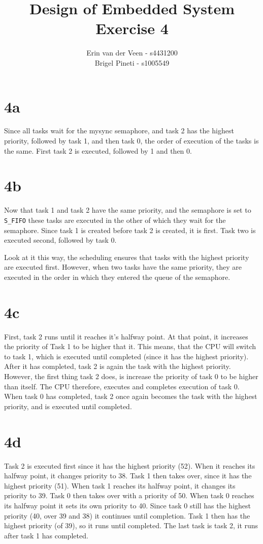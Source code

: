 \documentclass{scrartcl}
\title{Design of Embedded System\\Exercise 4}
\author{Erin van der Veen - s4431200\\
	Brigel Pineti - s1005549}
\begin{document}
\maketitle

\section*{4a}
Since all tasks wait for the mysync semaphore, and task 2 has the highest priority, followed by task 1, and then task 0, the order of execution of the tasks is the same.
First task 2 is executed, followed by 1 and then 0.

\section*{4b}
Now that task 1 and task 2 have the same priority, and the semaphore is set to \lstinline|S_FIFO| these tasks are executed in the other of which they wait for the semaphore.
Since task 1 is created before task 2 is created, it is first.
Task two is executed second, followed by task 0.

Look at it this way, the scheduling ensures that tasks with the highest priority are executed first.
However, when two tasks have the same priority, they are executed in the order in which they entered the queue of the semaphore.

\section*{4c}
First, task 2 runs until it reaches it's halfway point.
At that point, it increases the priority of Task 1 to be higher that it.
This means, that the CPU will switch to task 1, which is executed until completed (since it has the highest priority).
After it has completed, task 2 is again the task with the highest priority.
However, the first thing task 2 does, is increase the priority of task 0 to be higher than itself.
The CPU therefore, executes and completes execution of task 0.
When task 0 has completed, task 2 once again becomes the task with the highest priority, and is executed until completed.

\section*{4d}
Task 2 is executed first since it has the highest priority (52).
When it reaches its halfway point, it changes priority to 38.
Task 1 then takes over, since it has the highest priority (51).
When task 1 reaches its halfway point, it changes its priority to 39.
Task 0 then takes over with a priority of 50.
When task 0 reaches its halfway point it sets its own priority to 40.
Since task 0 still has the highest priority (40, over 39 and 38) it continues until completion.
Task 1 then has the highest priority (of 39), so it runs until completed.
The last task is task 2, it runs after task 1 has completed.
\end{document}
